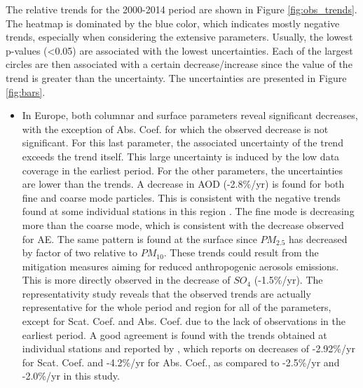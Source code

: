 \documentclass[journal abbreviation, manuscript]{copernicus}
\begin{document}
The relative trends for the 2000-2014 period are shown in Figure \ref{fig:obs_trends}. The heatmap is dominated by the blue color, which indicates mostly negative trends, especially when considering the extensive parameters. Usually, the lowest p-values (<0.05) are associated with the lowest uncertainties. Each of the largest circles are then associated with a certain decrease/increase since the value of the trend is greater than the uncertainty. The uncertainties are presented in Figure \ref{fig:bars}.

\begin{itemize}
 \item In Europe, both columnar and surface parameters reveal significant decreases, with the exception of Abs. Coef. for which the observed decrease is not significant. For this last parameter, the associated uncertainty of the trend exceeds the trend itself. This large uncertainty is induced by the low data coverage in the earliest period. For the other parameters, the uncertainties are lower than the trends. A decrease in AOD (-2.8\%/yr) is found for both fine and coarse mode particles. This is consistent with the negative trends found at some individual stations in this region \citep{glantz2019}. The fine mode is decreasing more than the coarse mode, which is consistent with the decrease observed for AE. The same pattern is found at the surface since $PM_{2.5}$ has decreased by factor of two relative to $PM_{10}$. These trends could result from the mitigation measures aiming for reduced anthropogenic aerosols emissions. This is more directly observed in the decrease of $SO_{4}$ (-1.5\%/yr). The representativity study reveals that the observed trends are actually representative for the whole period and region for all of the parameters, except for Scat. Coef. and Abs. Coef. due to the lack of observations in the earliest period. A good agreement is found with the trends obtained at individual stations and reported by \cite{collaudcoenprep}, which reports on decreases of -2.92\%/yr for Scat. Coef. and -4.2\%/yr for Abs. Coef., as compared to -2.5\%/yr and -2.0\%/yr in this study.

\end{itemize}
\end{document}
